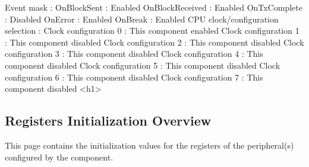 \begin{DoxyCode}
              Event mask                                   : 
                OnBlockSent                                : Enabled
                OnBlockReceived                            : Enabled
                OnTxComplete                               : Disabled
                OnError                                    : Enabled
                OnBreak                                    : Enabled
            CPU clock/configuration selection              : 
              Clock configuration 0                        : This component enabled
              Clock configuration 1                        : This component disabled
              Clock configuration 2                        : This component disabled
              Clock configuration 3                        : This component disabled
              Clock configuration 4                        : This component disabled
              Clock configuration 5                        : This component disabled
              Clock configuration 6                        : This component disabled
              Clock configuration 7                        : This component disabled
<h1>
\end{DoxyCode}
 \hypertarget{ASerialLdd1_regs_overview}{}\subsection{Registers Initialization Overview}\label{ASerialLdd1_regs_overview}
This page contains the initialization values for the registers of the peripheral(s) configured by the component. \tabulinesep=1mm

